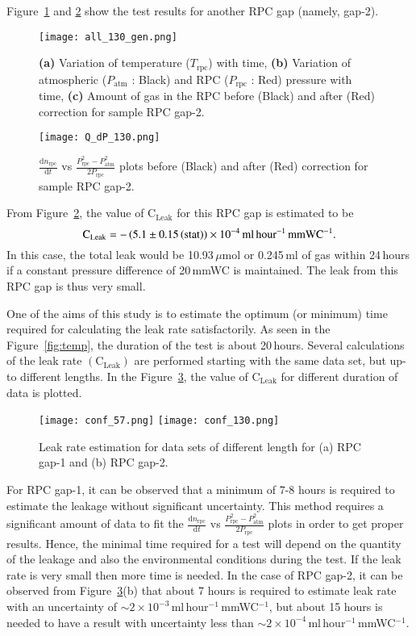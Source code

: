 Figure~\ref{fig:with1} and \ref{fig:qt1} show the test results for another RPC gap (namely, gap-2).
\begin{figure}
  \centering
  \texttt{[image: all\_130\_gen.png]}
  \caption{\textbf{(a)} Variation of temperature ($T_{\textrm{rpc}}$) with time, \textbf{(b)} Variation of atmospheric ($P_{\textrm{atm}}$ : Black) and RPC ($P_{\textrm{rpc}}$ : Red) pressure with time, \textbf{(c)} Amount of gas in the RPC before (Black) and after (Red) correction for sample RPC gap-2.}
  \label{fig:with1}
\end{figure}
\begin{figure}
  \centering
  \texttt{[image: Q\_dP\_130.png]}
  \caption{$\frac{\mathrm{d}n_{\textrm{rpc}}}{\mathrm{d}t}$ vs $\frac{P_{\textrm{rpc}}^{2}-P_{\textrm{atm}}^{2}}{2P_{\textrm{rpc}}}$ plots before (Black) and after (Red) correction for sample RPC gap-2.}
  \label{fig:qt1}
\end{figure}
From Figure~\ref{fig:qt1}, the value of $\textrm{C}_{\textrm{Leak}}$ for this RPC gap is estimated to be
\[\textrm{C}_{\textrm{Leak}}=-\left(5.1\pm 0.15\left(\textrm{stat}\right)\right)\times 10^{-4}\textrm{\,ml\,hour$^{-1}$\,mmWC$^{-1}$}.\]
In this case, the total leak would be 10.93\,$\mu$mol or 0.245\,ml of gas within 24\,hours if a constant pressure difference of 20\,mmWC is maintained. The leak from this RPC gap is thus very small.

One of the aims of this study is to estimate the optimum (or minimum) time required for calculating the leak rate satisfactorily. As seen in the Figure~\ref{fig:temp}, the duration of the test is about 20\,hours. Several calculations of the leak rate $\left(\textrm{C}_{\textrm{Leak}}\right)$ are performed starting with the same data set, but up-to different lengths. In the Figure~\ref{fig:time}, the value of $\textrm{C}_{\textrm{Leak}}$ for different duration of data is plotted.
\begin{figure}
  \centering
  \texttt{[image: conf\_57.png]}
  \vspace*{10pt}
  \texttt{[image: conf\_130.png]}
  \caption{Leak rate estimation for data sets of different length for (a) RPC gap-1 and (b) RPC gap-2.}
  \label{fig:time}
\end{figure}
For RPC gap-1, it can be observed that a minimum of 7-8 hours is required to estimate the leakage without significant uncertainty. This method requires a significant amount of data to fit the $\frac{\mathrm{d}n_{\textrm{rpc}}}{\mathrm{d}t}$ vs $\frac{P_{\textrm{rpc}}^{2}-P_{\textrm{atm}}^{2}}{2P_{\textrm{rpc}}}$ plots in order to get proper results. Hence, the minimal time required for a test will depend on the quantity of the leakage and also the environmental conditions during the test. If the leak rate is very small then more time is needed. In the case of RPC gap-2, it can be observed from Figure~\ref{fig:time}(b) that about 7 hours is required to estimate leak rate with an uncertainty of $\sim 2\times 10^{-3}$\,ml\,hour$^{-1}$\,mmWC$^{-1}$, but about 15 hours is needed to have a result with uncertainty less than $\sim 2\times 10^{-4}$\,ml\,hour$^{-1}$\,mmWC$^{-1}$.

